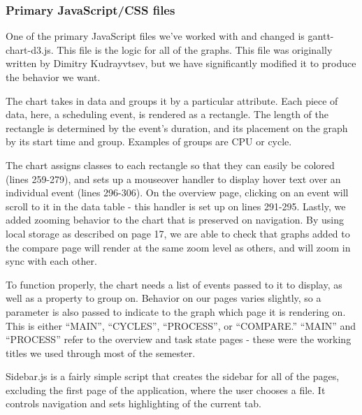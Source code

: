 \documentclass{hmcclinic}
\begin{document}
  \subsubsection{Primary JavaScript/CSS files}
  One of the primary JavaScript files we've worked
  with and changed is gantt-chart-d3.js. This file is the logic for all of the
  graphs. This file was originally written by Dimitry Kudrayvtsev, but we have
  significantly modified it to produce the behavior we want.

  The chart takes in data and groups it by a particular attribute. Each piece
  of data, here, a scheduling event, is rendered as a rectangle. The
  length of the rectangle is determined by the event's duration, and its
  placement on the graph by its start time and group. Examples of groups are
  CPU or cycle.

  The chart assigns classes to each rectangle so that they can easily be
  colored (lines 259-279), and sets up a mouseover handler to display hover text
  over an individual event (lines 296-306). On the overview page, clicking
  on an event will scroll to it in the data table - this handler is set up on
  lines 291-295. Lastly, we added zooming behavior to the chart that is
  preserved on navigation. By using local storage as described on page 17, we
  are able to check that graphs added to the compare page will render at the
  same zoom level as others, and will zoom in sync with each other.

  To function properly, the chart needs a list of events passed to it to
  display, as well as a property to group on. Behavior on our pages varies
  slightly, so a parameter is also passed to indicate to the graph which
  page it is rendering on. This is either ``MAIN'', ``CYCLES'', ``PROCESS'',
  or ``COMPARE.'' ``MAIN'' and ``PROCESS'' refer to the overview and task
  state pages - these were the working titles we used through most of the
  semester.

  Sidebar.js is a fairly simple script that creates the sidebar for all of the
  pages, excluding the first page of the application, where the user chooses a file.
  It controls navigation and sets highlighting of the current tab.
\end{document}
